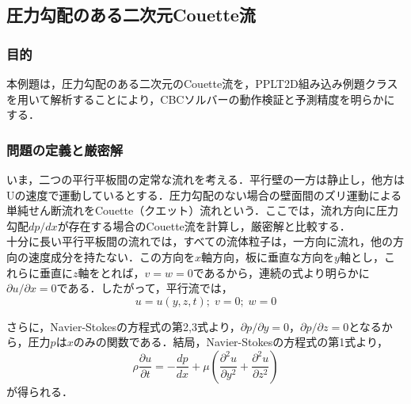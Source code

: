 
\graphicspath{{./fig_2Dcouette/}}

\subsection{圧力勾配のある二次元Couette流}
\label{subsection:2Dcouette}

%
\subsubsection{目的}
本例題は，圧力勾配のある二次元のCouette流を，PPLT2D組み込み例題クラスを用いて解析することにより，CBCソルバーの動作検証と予測精度を明らかにする．

%
\subsubsection{問題の定義と厳密解}
いま，二つの平行平板間の定常な流れを考える．平行壁の一方は静止し，他方はUの速度で運動しているとする．圧力勾配のない場合の壁面間のズリ運動による単純せん断流れをCouette（クエット）流れという\cite{imai:73}．ここでは，流れ方向に圧力勾配$dp/dx$が存在する場合のCouette流を計算し，厳密解と比較する\cite{hino:74:fd}．\\

十分に長い平行平板間の流れでは，すべての流体粒子は，一方向に流れ，他の方向の速度成分を持たない．この方向を$x$軸方向，板に垂直な方向を$y$軸とし，これらに垂直に$z$軸をとれば，$v=w=0$であるから，連続の式より明らかに${\partial u}/{\partial x}=0$である．したがって，平行流では，
\begin{equation}
u=u(y, z, t) ; \; v=0; \; w=0
\end{equation}

さらに，Navier-Stokesの方程式の第2,3式より，${\partial p}/{\partial y}=0$，${\partial p}/{\partial z}=0$となるから，圧力$p$は$x$のみの関数である．結局，Navier-Stokesの方程式の第1式より，
\begin{equation}
\rho \frac{\partial u}{\partial t} 
= - \frac{dp}{dx} 
+ \mu \left( \frac{{\partial}^2 u}{\partial y^2}
+ \frac{{\partial}^2 u}{\partial z^2}\right)
\label{eq:NS1}
\end{equation}
が得られる．

